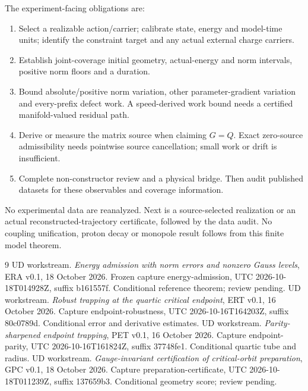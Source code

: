 \documentclass[11pt,a4paper]{article}
\begin{document}
The experiment-facing obligations are:
\begin{enumerate}
\item Select a realizable action/carrier; calibrate state, energy and model-time units; identify the constraint target and any actual external charge carriers.
\item Establish joint-coverage initial geometry, actual-energy and norm intervals, positive norm floors and a duration.
\item Bound absolute/positive norm variation, other parameter-gradient variation and every-prefix defect work. A speed-derived work bound needs a certified manifold-valued residual path.
\item Derive or measure the matrix source when claiming $G=Q$. Exact zero-source admissibility needs pointwise source cancellation; small work or drift is insufficient.
\item Complete non-constructor review and a physical bridge. Then audit published datasets for these observables and coverage information.
\end{enumerate}
No experimental data are reanalyzed. Next is a source-selected realization or an actual reconstructed-trajectory certificate, followed by the data audit. No coupling unification, proton decay or monopole result follows from this finite model theorem.
\begin{thebibliography}{9}\small\setlength{\itemsep}{2pt}
 UD workstream. \emph{Energy admission with norm errors and nonzero Gauss levels}, ERA v0.1, 18 October 2026. Frozen capture energy-admission, UTC 2026-10-18T014928Z, suffix b161557f. Conditional reference theorem; review pending.
 UD workstream. \emph{Robust trapping at the quartic critical endpoint}, ERT v0.1, 16 October 2026. Capture endpoint-robustness, UTC 2026-10-16T164203Z, suffix 80c0789d. Conditional error and derivative estimates.
 UD workstream. \emph{Parity-sharpened endpoint trapping}, PET v0.1, 16 October 2026. Capture endpoint-parity, UTC 2026-10-16T161824Z, suffix 37748fe1. Conditional quartic tube and radius.
 UD workstream. \emph{Gauge-invariant certification of critical-orbit preparation}, GPC v0.1, 18 October 2026. Capture preparation-certificate, UTC 2026-10-18T011239Z, suffix 137659b3. Conditional geometry score; review pending.
\end{thebibliography}
\end{document}
